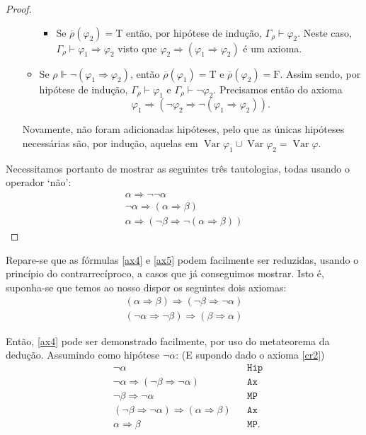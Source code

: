 \documentclass{report}
\theoremstyle{definition}
\theoremstyle{remark}
\newcommand{\lt}{\mathrm{T}}
\newcommand{\lf}{\mathrm{F}}
\DeclareMathOperator{\var}{Var}
\newcommand{\imply}{\mathbin{\Rightarrow}}
\begin{document}
\begin{proof}
\begin{itemize}
\begin{itemize}
\begin{itemize}
	\item Se $\overline\rho(\varphi_2) = \lt$ então, por hipótese de indução, $\Gamma_\rho \vdash \varphi_2$. Neste caso, $\Gamma_\rho \vdash \varphi_1 \imply \varphi_2$ visto que $\varphi_2 \imply (\varphi_1 \imply \varphi_2)$ é um axioma.
	\end{itemize}
	
	\item Se $\rho \Vdash \neg (\varphi_1 \imply \varphi_2)$, então $\overline\rho(\varphi_1) = \lt$ e $\overline\rho(\varphi_2) = \lf$. Assim sendo, por hipótese de indução, $\Gamma_\rho \vdash \varphi_1$ e $\Gamma_\rho \vdash \neg \varphi_2$. Precisamos então do axioma
	\[\varphi_1 \imply (\neg \varphi_2 \imply \neg (\varphi_1 \imply \varphi_2)).\]
	\end{itemize}
	
	Novamente, não foram adicionadas hipóteses, pelo que as únicas hipóteses necessárias são, por indução, aquelas em $\var \varphi_1 \cup \var \varphi_2 = \var \varphi$.
	\end{itemize}
	
	Necessitamos portanto de mostrar as seguintes três tautologias, todas usando o operador `não':
	\begin{gather}
	\alpha \imply \neg \neg \alpha\label{ax3}\\
	\neg \alpha \imply (\alpha \imply \beta)\label{ax4}\\
	\alpha \imply (\neg \beta \imply \neg (\alpha \imply \beta))\label{ax5}
	\end{gather}
	
	\end{proof}
	
	Repare-se que as fórmulas \eqref{ax4} e \eqref{ax5} podem facilmente ser reduzidas, usando o princípio do contrarrecíproco, a casos que já conseguimos mostrar. Isto é, suponha-se que temos ao nosso dispor os seguintes dois axiomas:
	\begin{gather}
	(\alpha \imply \beta) \imply (\neg \beta \imply \neg \alpha)\label{cr1}\\
	(\neg \alpha \imply \neg \beta) \imply (\beta \imply \alpha)\label{cr2}
	\end{gather}
	
	Então, \eqref{ax4} pode ser demonstrado facilmente, por uso do metateorema da dedução. Assumindo como hipótese $\neg \alpha$: (E supondo dado o axioma \eqref{cr2})
	\begin{align*}
	&\neg \alpha&&\texttt{Hip}\\
	&\neg \alpha \imply (\neg \beta \imply \neg \alpha)&&\texttt{Ax}\\
	&\neg \beta \imply \neg \alpha&&\texttt{MP}\\
	&(\neg \beta \imply \neg \alpha) \imply (\alpha \imply \beta)&&\texttt{Ax}\\
	&\alpha \imply \beta&&\texttt{MP}.
	\end{align*}
	
\end{document}
